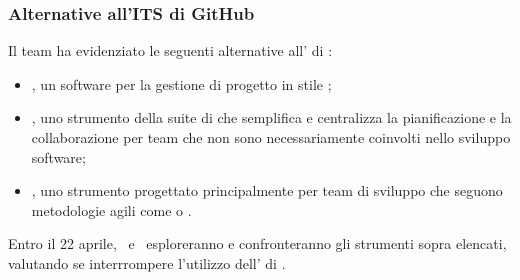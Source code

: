 \newpage
\subsubsection{Alternative all'ITS di GitHub}
\par Il team ha evidenziato le seguenti alternative all' di :
\begin{itemize}
  \item {}, un software per la gestione di progetto in stile ;
  \item {}, uno strumento della suite di  che semplifica e centralizza la pianificazione e la collaborazione per team che non sono necessariamente coinvolti nello sviluppo software;
  \item {}, uno strumento progettato principalmente per team di sviluppo che seguono metodologie agili come  o .
\end{itemize}

\vspace{0.5\baselineskip}
\par Entro il 22 aprile, \riccardo\ e \mattia\ esploreranno e confronteranno gli strumenti sopra elencati, valutando se interrrompere l'utilizzo dell' di .